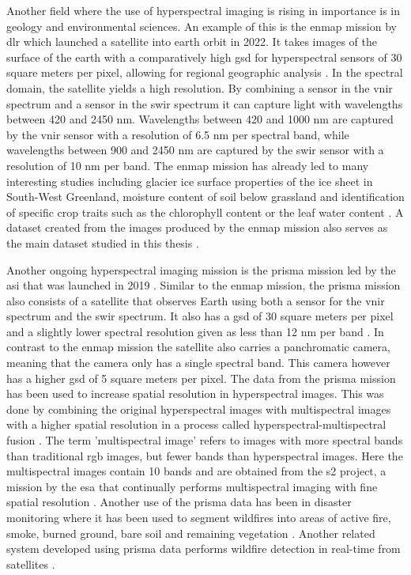 Another field where the use of hyperspectral imaging is rising in importance is in geology and environmental sciences. An example of this is the \ac{enmap} mission by \ac{dlr} which launched a satellite into earth orbit in 2022. It takes images of the surface of the earth with a comparatively high \ac{gsd} for hyperspectral sensors of 30 square meters per pixel, allowing for regional geographic analysis \citep{guanter_enmap_2015}. In the spectral domain, the satellite yields a high resolution. By combining a sensor in the \ac{vnir} spectrum and a sensor in the \ac{swir} spectrum it can capture light with wavelengths between 420 and 2450 nm. Wavelengths between 420 and 1000 nm are captured by the \ac{vnir} sensor with a resolution of 6.5 nm per spectral band, while wavelengths between 900 and 2450 nm are captured by the \ac{swir} sensor with a resolution of 10 nm per band.
The \ac{enmap} mission has already led to many interesting studies including glacier ice surface properties of the ice sheet in South-West Greenland, moisture content of soil below grassland and identification of specific crop traits such as the chlorophyll content or the leaf water content \citep{bohn_glacier_2022,pascual-venteo_prototyping_2022,dopper_estimating_2022}.
A dataset created from the images produced by the \ac{enmap} mission also serves as the main dataset studied in this thesis \citep{fuchs_hyspecnet-11k_2023}.

Another ongoing hyperspectral imaging mission is the \ac{prisma} mission led by the \ac{asi} that was launched in 2019 \citep{loizzo_prisma_2019}. Similar to the \ac{enmap} mission, the \ac{prisma} mission also consists of a satellite that observes Earth using both a sensor for the \ac{vnir} spectrum and the \ac{swir} spectrum. It also has a \ac{gsd} of 30 square meters per pixel and a slightly lower spectral resolution given as less than 12 nm per band \citep{guarini_overview_2017,guarini_prisma_2018}. In contrast to the \ac{enmap} mission the satellite also carries a panchromatic camera, meaning that the camera only has a single spectral band. This camera however has a higher \ac{gsd} of 5 square meters per pixel. The data from the \ac{prisma} mission has been used to increase spatial resolution in hyperspectral images. This was done by combining the original hyperspectral images with multispectral images with a higher spatial resolution in a process called hyperspectral-multispectral fusion \citep{acito_prisma_2022}. The term 'multispectral image' refers to images with more spectral bands than traditional \ac{rgb} images, but fewer bands than hyperspectral images. Here the multispectral images contain 10 bands and are obtained from the \ac{s2} project, a mission by the \ac{esa} that continually performs multispectral imaging with fine spatial resolution \citep{drusch_sentinel-2_2012}. Another use of the \ac{prisma} data has been in disaster monitoring where it has been used to segment wildfires into areas of active fire, smoke, burned ground, bare soil and remaining vegetation \citep{spiller_transfer_2022}. Another related system developed using \ac{prisma} data performs wildfire detection in real-time from satellites  \citep{spiller_wildfire_2022}.

